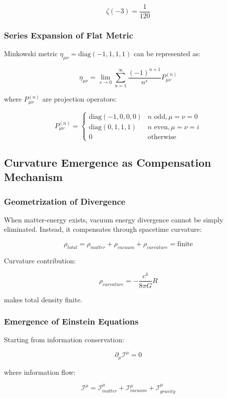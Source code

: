 \documentclass[12pt,a4paper]{article}
\begin{document}
$$\zeta(-3) = \frac{1}{120}$$

\subsubsection{Series Expansion of Flat Metric}

Minkowski metric $\eta_{\mu\nu} = \text{diag}(-1,1,1,1)$ can be represented as:

$$\eta_{\mu\nu} = \lim_{s \to 0} \sum_{n=1}^{\infty} \frac{(-1)^{n+1}}{n^s} P_{\mu\nu}^{(n)}$$

where $P_{\mu\nu}^{(n)}$ are projection operators:

$$P_{\mu\nu}^{(n)} = \begin{cases}
\text{diag}(-1,0,0,0) & n \text{ odd}, \mu=\nu=0 \\
\text{diag}(0,1,1,1) & n \text{ even}, \mu=\nu=i \\
0 & \text{otherwise}
\end{cases}$$

\subsection{Curvature Emergence as Compensation Mechanism}

\subsubsection{Geometrization of Divergence}

When matter-energy exists, vacuum energy divergence cannot be simply eliminated. Instead, it compensates through spacetime curvature:

$$\rho_{total} = \rho_{matter} + \rho_{vacuum} + \rho_{curvature} = \text{finite}$$

Curvature contribution:

$$\rho_{curvature} = -\frac{c^4}{8\pi G} R$$

makes total density finite.

\subsubsection{Emergence of Einstein Equations}

Starting from information conservation:

$$\partial_\mu \mathcal{I}^\mu = 0$$

where information flow:

$$\mathcal{I}^\mu = \mathcal{I}_{matter}^\mu + \mathcal{I}_{vacuum}^\mu + \mathcal{I}_{gravity}^\mu$$
\end{document}
